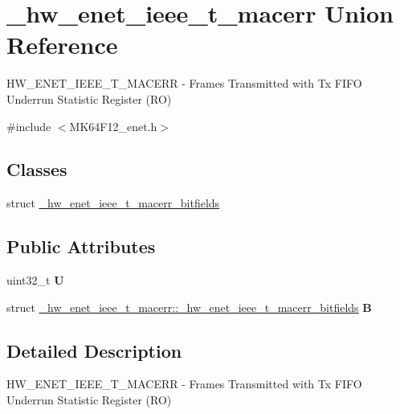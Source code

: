\hypertarget{union__hw__enet__ieee__t__macerr}{}\section{\+\_\+hw\+\_\+enet\+\_\+ieee\+\_\+t\+\_\+macerr Union Reference}
\label{union__hw__enet__ieee__t__macerr}


H\+W\+\_\+\+E\+N\+E\+T\+\_\+\+I\+E\+E\+E\+\_\+\+T\+\_\+\+M\+A\+C\+E\+RR -\/ Frames Transmitted with Tx F\+I\+FO Underrun Statistic Register (RO)  




{\ttfamily \#include $<$M\+K64\+F12\+\_\+enet.\+h$>$}

\subsection*{Classes}
\begin{DoxyCompactItemize}
\item 
struct \hyperlink{struct__hw__enet__ieee__t__macerr_1_1__hw__enet__ieee__t__macerr__bitfields}{\+\_\+hw\+\_\+enet\+\_\+ieee\+\_\+t\+\_\+macerr\+\_\+bitfields}
\end{DoxyCompactItemize}
\subsection*{Public Attributes}
\begin{DoxyCompactItemize}
\item 
uint32\+\_\+t {\bfseries U}\hypertarget{union__hw__enet__ieee__t__macerr_aa94f3632fc8545454826dab14ac0fb8c}{}\label{union__hw__enet__ieee__t__macerr_aa94f3632fc8545454826dab14ac0fb8c}

\item 
struct \hyperlink{struct__hw__enet__ieee__t__macerr_1_1__hw__enet__ieee__t__macerr__bitfields}{\+\_\+hw\+\_\+enet\+\_\+ieee\+\_\+t\+\_\+macerr\+::\+\_\+hw\+\_\+enet\+\_\+ieee\+\_\+t\+\_\+macerr\+\_\+bitfields} {\bfseries B}\hypertarget{union__hw__enet__ieee__t__macerr_a666414dd22ceeb91e48aeb3030afa4a8}{}\label{union__hw__enet__ieee__t__macerr_a666414dd22ceeb91e48aeb3030afa4a8}

\end{DoxyCompactItemize}


\subsection{Detailed Description}
H\+W\+\_\+\+E\+N\+E\+T\+\_\+\+I\+E\+E\+E\+\_\+\+T\+\_\+\+M\+A\+C\+E\+RR -\/ Frames Transmitted with Tx F\+I\+FO Underrun Statistic Register (RO) 

